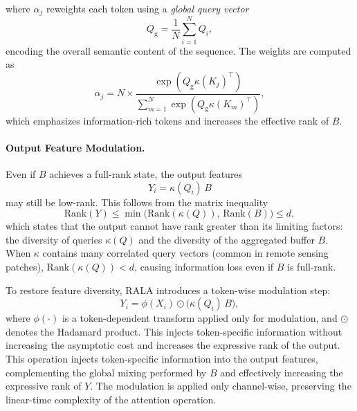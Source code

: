 \documentclass[runningheads]{llncs}
\begin{document}
\noindent where $\alpha_j$ reweights each token using a \emph{global query
vector}
\begin{equation}
Q_{\mathrm{g}}=\frac{1}{N}\sum_{i=1}^N Q_i,
\label{eq:global_query}
\end{equation}
encoding the overall semantic content of the sequence. The weights are
computed as
\begin{equation}
\alpha_j=N \times \frac{\exp(Q_{\mathrm{g}}\kappa(K_j)^\top)}
{\sum_{m=1}^{N}\exp(Q_{\mathrm{g}}\kappa(K_m)^\top)},
\label{eq:alpha_softmax}
\end{equation}
which emphasizes information-rich tokens and increases the effective rank of $B$.

\paragraph{Output Feature Modulation.}
Even if $B$ achieves a full-rank state, the output features
\begin{equation}
Y_i=\kappa(Q_i)\,B
\label{eq:Y_pre_modulation}
\end{equation}
may still be low-rank.
This follows from the matrix inequality
\begin{equation}
\mathrm{Rank}(Y)\le \min\big(\mathrm{Rank}(\kappa(Q)),\,\mathrm{Rank}(B)\big)\le d,
\label{eq:rank_inequality}
\end{equation}
which states that the output cannot have rank greater than its limiting factors:
the diversity of queries \(\kappa(Q)\) and the diversity of the aggregated
buffer \(B\). When $\kappa$ contains many correlated query vectors (common in
remote sensing patches), $\mathrm{Rank}(\kappa(Q))<d$, causing information loss
even if $B$ is full-rank.

To restore feature diversity, RALA introduces a token-wise modulation step:
\begin{equation}
Y_i=\phi(X_i)\odot \Big(\kappa(Q_i)\,B\Big),
\label{eq:Yi_modulated}
\end{equation}
where $\phi(\cdot)$ is a token-dependent transform applied only for modulation,
and $\odot$ denotes the Hadamard product.
This injects token-specific information without increasing the asymptotic cost
and increases the expressive rank of the output.
This operation injects token-specific information into the output features,
complementing the global mixing performed by $B$ and effectively increasing
the expressive rank of $Y$. The modulation is applied only channel-wise,
preserving the linear-time complexity of the attention operation.
\end{document}
